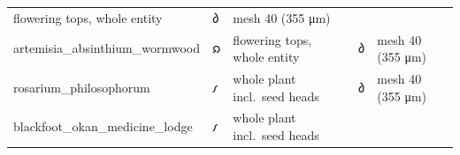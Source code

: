 \begin{longtable}[]{@{}lllll@{}}
\begin{minipage}[t]{0.17\columnwidth}
flowering tops, whole entity\strut
\end{minipage} & \begin{minipage}[t]{0.17\columnwidth}\raggedright
𐑔\strut
\end{minipage} & \begin{minipage}[t]{0.17\columnwidth}\raggedright
mesh 40 (355 μm)\strut
\end{minipage}\tabularnewline
\begin{minipage}[t]{0.17\columnwidth}\raggedright
artemisia\_absinthium\_wormwood\strut
\end{minipage} & \begin{minipage}[t]{0.17\columnwidth}\raggedright
𐑸\strut
\end{minipage} & \begin{minipage}[t]{0.17\columnwidth}\raggedright
flowering tops, whole entity\strut
\end{minipage} & \begin{minipage}[t]{0.17\columnwidth}\raggedright
𐑔\strut
\end{minipage} & \begin{minipage}[t]{0.17\columnwidth}\raggedright
mesh 40 (355 μm)\strut
\end{minipage}\tabularnewline
\begin{minipage}[t]{0.17\columnwidth}\raggedright
rosarium\_philosophorum\strut
\end{minipage} & \begin{minipage}[t]{0.17\columnwidth}\raggedright
𐑥\strut
\end{minipage} & \begin{minipage}[t]{0.17\columnwidth}\raggedright
whole plant incl.~seed heads\strut
\end{minipage} & \begin{minipage}[t]{0.17\columnwidth}\raggedright
𐑔\strut
\end{minipage} & \begin{minipage}[t]{0.17\columnwidth}\raggedright
mesh 40 (355 μm)\strut
\end{minipage}\tabularnewline
\begin{minipage}[t]{0.17\columnwidth}\raggedright
blackfoot\_okan\_medicine\_lodge\strut
\end{minipage} & \begin{minipage}[t]{0.17\columnwidth}\raggedright
𐑥\strut
\end{minipage} & \begin{minipage}[t]{0.17\columnwidth}\raggedright
whole plant incl.~seed heads\strut

\end{minipage}
\end{longtable}
